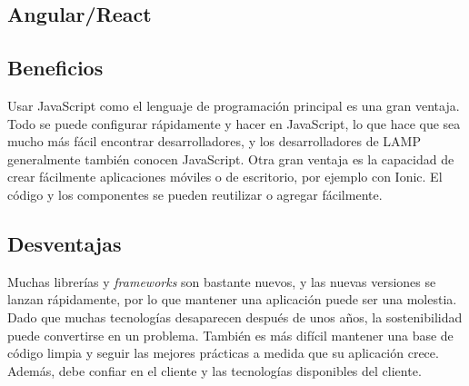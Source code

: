 \subsection{Angular/React}


\subsection{Beneficios}
Usar JavaScript como el lenguaje de programación principal es una gran ventaja. Todo se puede configurar rápidamente y hacer en JavaScript, lo que hace que sea mucho más fácil encontrar desarrolladores, y los desarrolladores de LAMP generalmente también conocen JavaScript. Otra gran ventaja es la capacidad de crear fácilmente aplicaciones móviles o de escritorio, por ejemplo con Ionic. El código y los componentes se pueden reutilizar o agregar fácilmente.

\subsection{Desventajas}
Muchas librerías y \textit{frameworks} son bastante nuevos, y las nuevas versiones se lanzan rápidamente, por lo que mantener una aplicación puede ser una molestia. Dado que muchas tecnologías desaparecen después de unos años, la sostenibilidad puede convertirse en un problema. También es más difícil mantener una base de código limpia y seguir las mejores prácticas a medida que su aplicación crece. Además, debe confiar en el cliente y las tecnologías disponibles del cliente.